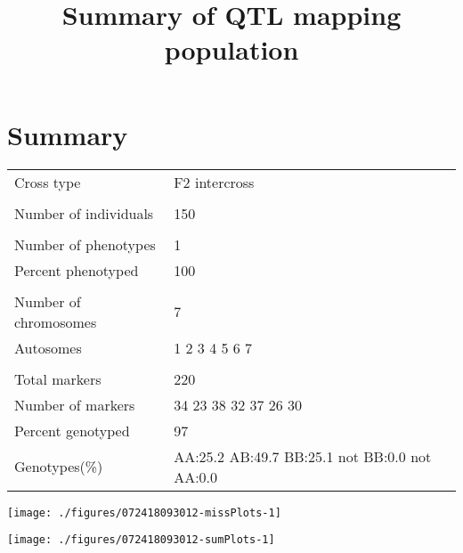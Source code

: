 \documentclass[a4paper,11pt]{article}\usepackage[]{graphicx}\usepackage[]{color}
\title{Summary of QTL mapping population}
\author{\vspace{-5ex}}
\date{\vspace{-5ex}}
\newenvironment{knitrout}{}{} %
\begin{document}


\maketitle
\singlespacing

\section{Summary}
\begin{table}[ht]
\begin{flushleft}
\begin{tabularx}{\textwidth}{lX}
  Cross type & F2 intercross \\ 
   &  \\ 
  Number of individuals & 150 \\ 
   &  \\ 
  Number of phenotypes & 1 \\ 
  Percent phenotyped & 100 \\ 
   &  \\ 
  Number of chromosomes & 7 \\ 
    Autosomes & 1 2 3 4 5 6 7 \\ 
   &  \\ 
  Total markers & 220 \\ 
  Number of markers & 34 23 38 32 37 26 30 \\ 
  Percent genotyped & 97 \\ 
  Genotypes(\%) & AA:25.2 AB:49.7 BB:25.1 not BB:0.0 not AA:0.0 \\ 
  \end{tabularx}
\label{summary}
\end{flushleft}
\end{table}

\begin{knitrout}
\color{fgcolor}
\texttt{[image: ./figures/072418093012-missPlots-1]} 

\end{knitrout}
\begin{knitrout}
\color{fgcolor}
\texttt{[image: ./figures/072418093012-sumPlots-1]} 

\end{knitrout}
\end{document}
